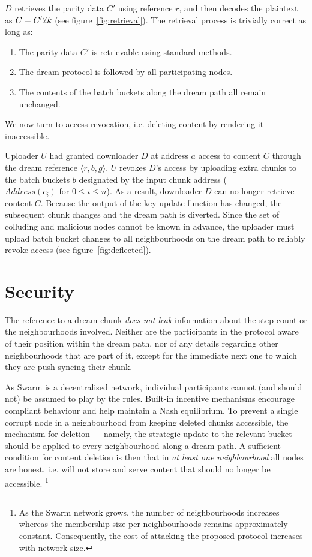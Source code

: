 \documentclass[singlecolumn]{acmart}
\newcommand\xor{\text{\small$\veebar$}}
\begin{document}
$D$ retrieves the parity data $C'$ using reference $r$, and then decodes the plaintext as $C=C'\xor k$ (see figure~\ref{fig:retrieval}).
The retrieval process is trivially correct as long as: 
\begin{enumerate}[noitemsep]
\item The parity data $C'$ is retrievable using standard methods.
\item The dream protocol is followed by all participating nodes.
\item The contents of the batch buckets along the dream path all remain unchanged. 
\end{enumerate}

We now turn to access revocation, i.e. deleting content by rendering it inaccessible. 

Uploader $U$ had granted downloader $D$ at address $a$ access to content $C$ through the dream reference $\langle r,b,g\rangle $. $U$ revokes $D$'s access by uploading extra chunks to the batch buckets $b$  designated by the input chunk address ($\mathit{Address}(c_i)\text{ for }0\le i\le n$). 
As a result, downloader $D$ can no longer retrieve content $C$. Because the output of the key update function has changed, the subsequent chunk changes and the dream path is diverted. Since the set of colluding and malicious nodes cannot be known in advance, the uploader must upload batch bucket changes to all neighbourhoods on the dream path to reliably revoke access (see figure~\ref{fig:deflected}).


\section{Security}
\label{sec:security}

The reference to a dream chunk \textit{does not leak} information about the step-count or the neighbourhoods involved. Neither are the participants in the protocol aware of their position within the dream path, nor of any details regarding other neighbourhoods that are part of it, except for the immediate next one to which they are push-syncing their chunk.

As Swarm is a decentralised network, individual participants cannot (and should not) be assumed to play by the rules. Built-in incentive mechanisms encourage compliant behaviour and help maintain a Nash equilibrium. To prevent a single corrupt node in a neighbourhood from keeping deleted chunks accessible, the mechanism for deletion — namely, the strategic update to the relevant bucket — should be applied to every neighbourhood along a dream path. A sufficient condition for content deletion is then that in \emph{at least one neighbourhood} all nodes are honest, i.e. will not store and serve content that should no longer be accessible.%
%
\footnote{As the Swarm network grows, the number of neighbourhoods increases whereas the membership size per neighbourhoods remains approximately constant. Consequently, the cost of attacking the proposed protocol increases with network size.}
%
\end{document}
